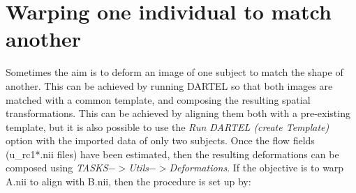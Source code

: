 \section{Warping one individual to match another}
Sometimes the aim is to deform an image of one subject to match the shape of another.
This can be achieved by running DARTEL so that both images are matched with a common template, and composing the resulting spatial transformations.
This can be achieved by aligning them both with a pre-existing template, but it is also possible to use the \emph{Run DARTEL (create Template)} option with the imported data of only two subjects.
Once the flow fields (u\_rc1*.nii files) have been estimated, then the resulting deformations can be composed using \emph{TASKS$->$Utils$->$Deformations}.
If the objective is to warp A.nii to align with B.nii, then the procedure is set up by:
